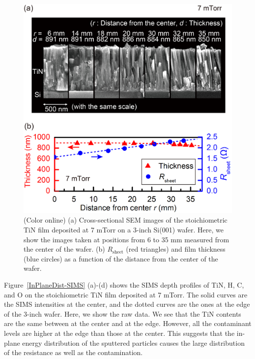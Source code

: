 \documentclass{report}
\begin{document}
\begin{figure}
\begin{center}
\includegraphics{InPlaneDist.jpg}
\end{center}

\caption{(Color online) (a) Cross-sectional SEM images of the stoichiometric TiN film deposited at 7 mTorr on a 3-inch Si(001) wafer. Here, we show the images taken at positions from 6 to 35 mm measured from the center of the wafer. (b) $R$$_{\text{sheet}}$ (red triangles) and film thickness (blue circles) as a function of the distance from the center of the wafer.}
\label{InPlaneDist}
\end{figure}
Figure \,\ref{InPlaneDist-SIMS} (a)-(d) shows the SIMS depth profiles of TiN, H, C, and O on the stoichiometric TiN film deposited at 7 mTorr. The solid curves are the SIMS intensities at the center, and the dotted curves are the ones at the edge of the 3-inch wafer. Here, we show the raw data. We see that the TiN contents are the same between at the center and at the edge. However, all the contaminant levels are higher at the edge than those at the center.  This suggests that the in-plane energy distribution of the sputtered particles causes the large distribution of the resistance as well as the contamination.
\end{document}
